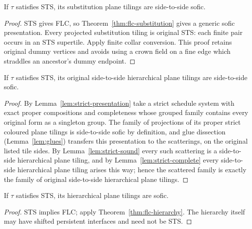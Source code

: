 \begin{theorem}\label{thm:sts-substitution}
If $\tau$ satisfies STS, its substitution plane tilings are side-to-side sofic.
\end{theorem}
\begin{proof}
STS gives FLC, so Theorem~\ref{thm:flc-substitution} gives a generic sofic
presentation. Every projected substitution tiling is original STS: each
finite pair occurs in an STS supertile. Apply finite collar conversion.
This proof retains original dummy vertices and avoids using a crown field
on a fine edge which straddles an ancestor's dummy endpoint.
\end{proof}

\begin{theorem}\label{thm:sts-stshierarchy}
If $\tau$ satisfies STS, its original side-to-side hierarchical plane
tilings are side-to-side sofic.
\end{theorem}
\begin{proof}
By Lemma~\ref{lem:strict-presentation} take a strict schedule system with
exact proper compositions and completeness whose grouped family contains
every original form as a singleton group. The family of projections of its
proper strict coloured plane tilings is side-to-side sofic by definition,
and glue dissection (Lemma~\ref{lem:glues}) transfers this presentation to
the scatterings, on the original listed tile sides. By
Lemma~\ref{lem:strict-sound} every such scattering is a side-to-side
hierarchical plane tiling, and by Lemma~\ref{lem:strict-complete} every
side-to-side hierarchical plane tiling arises this way; hence the scattered
family is exactly the family of original side-to-side hierarchical plane
tilings.
\end{proof}

\begin{theorem}\label{thm:sts-hierarchy}
If $\tau$ satisfies STS, its hierarchical plane tilings are sofic.
\end{theorem}
\begin{proof}
STS implies FLC; apply Theorem~\ref{thm:flc-hierarchy}. The hierarchy itself
may have shifted persistent interfaces and need not be STS.
\end{proof}

